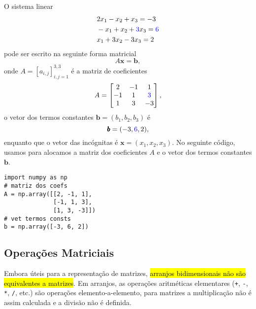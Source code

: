\begin{ex}\label{cap_arr_sec_mat:ex:sislin}
  O sistema linear
  \begin{subequations}
    \begin{align}
      &2x_1 - x_2 + x_3 = -3\\
      &-x_1 + x_2 + {\color{blue}3}x_3 = {\color{blue}6}\\
      &x_1 + 3x_2 - 3x_3 = 2
    \end{align}
  \end{subequations}
  pode ser escrito na seguinte forma matricial
  \begin{equation}
    A\pmb{x} = \pmb{b},
  \end{equation}
  onde $A = [a_{i,j}]_{i,j=1}^{3,3}$ é a matriz de coeficientes
  \begin{equation}
    A =
    \begin{bmatrix}
      2 & -1 & 1\\
      -1 & 1 & {\color{blue}3}\\
      1 & 3 & -3
    \end{bmatrix},
  \end{equation}
  o vetor dos termos constantes $\pmb{b} = (b_1, b_2, b_3)$ é
  \begin{equation}
    \pmb{b} = (-3, {\color{blue}6}, 2),
  \end{equation}
  enquanto que o vetor das incógnitas é $\pmb{x} = (x_1, x_2, x_3)$. No seguinte código, usamos {\PYTHONnumpyDOTarray} para alocamos a matriz dos coeficientes $A$ e o vetor dos termos constantes $\pmb{b}$.

\begin{lstlisting}
import numpy as np
# matriz dos coefs
A = np.array([[2, -1, 1],
              [-1, 1, 3],
              [1, 3, -3]])
# vet termos consts
b = np.array([-3, 6, 2])
\end{lstlisting}

\end{ex}

\subsection{Operações Matriciais}

Embora úteis para a representação de matrizes, \hl{arranjos bidimensionais não são equivalentes a matrizes}. Em arranjos, as operações aritméticas elementares (\lstinline!+!, \lstinline!-!, \lstinline!*!, \lstinline!/!, etc.) são operações elemento-a-elemento, para matrizes a multiplicação não é assim calculada e a divisão não é definida.

